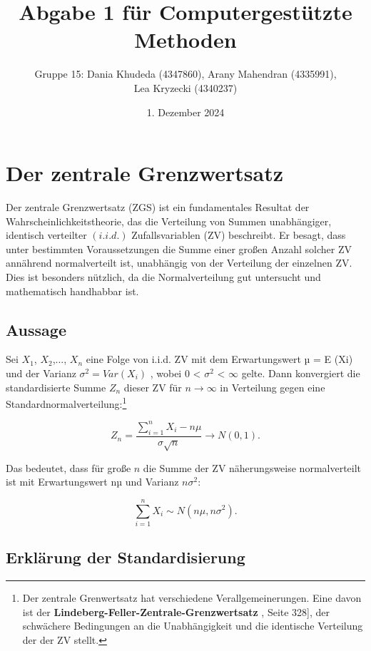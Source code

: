 \documentclass{article}
\title{Abgabe 1 für Computergestützte Methoden}
\author{Gruppe 15: Dania Khudeda (4347860), Arany Mahendran (4335991), \\
Lea Kryzecki (4340237)}
\date{1. Dezember 2024}
\begin{document}
\maketitle 
\tableofcontents
\newpage
\section{Der zentrale Grenzwertsatz}

Der zentrale Grenzwertsatz (ZGS) ist ein fundamentales Resultat der Wahrscheinlichkeitstheorie, das die Verteilung von Summen unabhängiger, identisch verteilter $(i.i.d.)$ Zufallsvariablen (ZV) beschreibt. 
Er besagt, dass unter bestimmten Voraussetzungen die Summe einer großen Anzahl solcher ZV annährend normalverteilt ist, unabhängig von der Verteilung der einzelnen ZV. Dies ist besonders nützlich, da die Normalverteilung gut untersucht und mathematisch handhabbar ist.

\subsection{Aussage}

Sei $X_1$, $X_2$,..., $X_n$ eine Folge von i.i.d. ZV mit dem Erwartungswert µ = E (Xi) und der Varianz $\sigma^2 = Var(X_i)$ , wobei 0 < $\sigma^2$ < $\infty$ gelte. Dann konvergiert die standardisierte Summe $Z_n$ dieser ZV für ${n \to \infty}$ in Verteilung gegen eine Standardnormalverteilung:\footnote[1]{Der zentrale Grenwertsatz hat verschiedene Verallgemeinerungen. Eine davon ist der \textbf{Lindeberg-Feller-Zentrale-Grenzwertsatz} \cite{buch}, Seite 328], der schwächere Bedingungen an die Unabhängigkeit und die identische Verteilung der der ZV stellt.}

 \begin{equation}
 \label{eq: sum}
     Z_n = \frac{\sum_{i=1}^{n} X_i - n\mu}  {\sigma\sqrt{n}}\to N(0,1). 
 \end{equation}


Das bedeutet, dass für große $n$ die Summe der ZV näherungsweise normalverteilt ist mit Erwartungswert nµ und Varianz $n\sigma^2$: 

\begin{equation}
    \label{eq: sum1}
 \sum_{i=1}^{n} X_i \sim N(n\mu, n\sigma^2).
\end{equation}

\subsection{Erklärung der Standardisierung}
\end{document}
